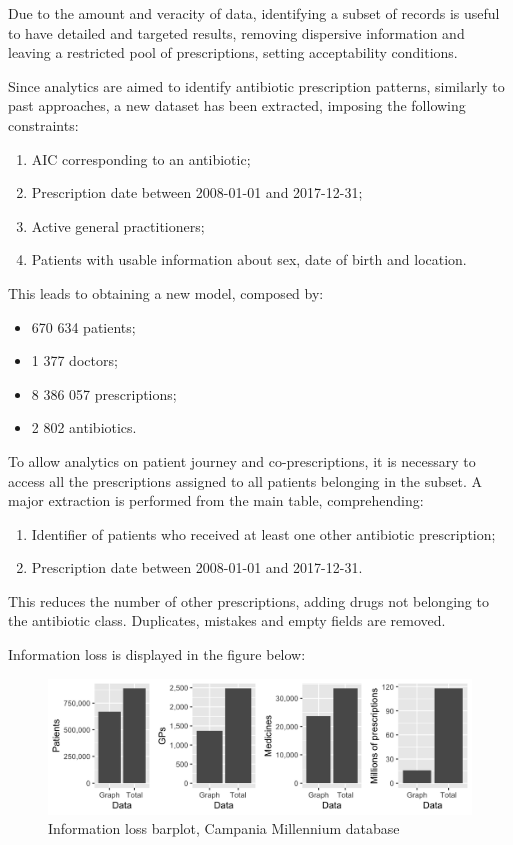 Due to the amount and veracity of data, identifying a subset of records is useful to have detailed and targeted results, removing dispersive information and leaving a restricted pool of prescriptions, setting acceptability conditions. 

Since analytics are aimed to identify antibiotic prescription patterns, similarly to past approaches, a new dataset has been extracted, imposing the following constraints:
\begin{enumerate}
	\item AIC corresponding to an antibiotic;
	\item Prescription date between 2008-01-01 and 2017-12-31;
	\item Active general practitioners;
	\item Patients with usable information about sex, date of birth and location.
\end{enumerate}

This leads to obtaining a new model, composed by:
\begin{itemize}
	\item 670 634 patients;
	\item 1 377 doctors;
	\item 8 386 057 prescriptions;
	\item 2 802 antibiotics.
\end{itemize}

To allow analytics on patient journey and co-prescriptions, it is necessary to access all the prescriptions assigned to all patients belonging in the subset. A major extraction is performed from the main table, comprehending:
\begin{enumerate}
	\item Identifier of patients who received at least one other antibiotic prescription;
	\item Prescription date between 2008-01-01 and 2017-12-31.
\end{enumerate}

This reduces the number of other prescriptions, adding drugs not belonging to the antibiotic class. Duplicates, mistakes and empty fields are removed. 

Information loss is displayed in the figure below:
\begin{figure}[h]
	\centering
	\includegraphics[scale=0.33]{../plots/graph-barplots.png}
	\caption{\small Information loss barplot, Campania Millennium database}
\end{figure}

